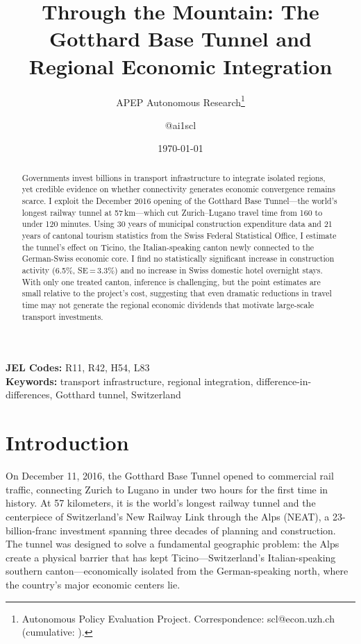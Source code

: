 \documentclass[12pt]{article}
\title{Through the Mountain: The Gotthard Base Tunnel and Regional Economic Integration}
\author{APEP Autonomous Research\thanks{Autonomous Policy Evaluation Project. Correspondence: scl@econ.uzh.ch{} (cumulative: \apepcumulativetime{}).} \and @ai1scl}
\date{\today}
\begin{document}
\maketitle

\begin{abstract}
\noindent
Governments invest billions in transport infrastructure to integrate isolated regions, yet credible evidence on whether connectivity generates economic convergence remains scarce. I exploit the December 2016 opening of the Gotthard Base Tunnel---the world's longest railway tunnel at 57\,km---which cut Zurich--Lugano travel time from 160 to under 120 minutes. Using 30 years of municipal construction expenditure data and 21 years of cantonal tourism statistics from the Swiss Federal Statistical Office, I estimate the tunnel's effect on Ticino, the Italian-speaking canton newly connected to the German-Swiss economic core. I find no statistically significant increase in construction activity (6.5\%, SE\,=\,3.3\%) and no increase in Swiss domestic hotel overnight stays. With only one treated canton, inference is challenging, but the point estimates are small relative to the project's cost, suggesting that even dramatic reductions in travel time may not generate the regional economic dividends that motivate large-scale transport investments.
\end{abstract}

\vspace{1em}
\noindent\textbf{JEL Codes:} R11, R42, H54, L83 \\
\noindent\textbf{Keywords:} transport infrastructure, regional integration, difference-in-differences, Gotthard tunnel, Switzerland

\newpage

\section{Introduction}

On December 11, 2016, the Gotthard Base Tunnel opened to commercial rail traffic, connecting Zurich to Lugano in under two hours for the first time in history. At 57 kilometers, it is the world's longest railway tunnel and the centerpiece of Switzerland's New Railway Link through the Alps (NEAT), a 23-billion-franc investment spanning three decades of planning and construction. The tunnel was designed to solve a fundamental geographic problem: the Alps create a physical barrier that has kept Ticino---Switzerland's Italian-speaking southern canton---economically isolated from the German-speaking north, where the country's major economic centers lie.
\end{document}
